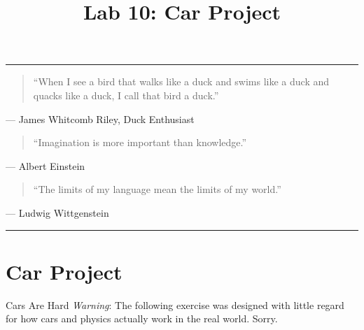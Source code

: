 \documentclass[11pt]{cselabheader}
\title{Lab 10: Car Project}
\begin{document}
\maketitle

\hrule

\begin{quotation}
  ``When I see a bird that walks like a duck and swims like a duck and quacks like
  a duck, I call that bird a duck.''
\end{quotation}
\begin{flushright}
  --- James Whitcomb Riley, Duck Enthusiast
\end{flushright}



\begin{quotation}
``Imagination is more important than knowledge.''
\end{quotation}
\begin{flushright}
  --- Albert Einstein
\end{flushright}

\begin{quotation}
``The limits of my language mean the limits of my world.''
\end{quotation}
\begin{flushright}
  --- Ludwig Wittgenstein
\end{flushright}

\hrule


\section{Car Project}

\begin{warningbox}{Cars Are Hard}
  \emph{Warning}: The following exercise was designed with little regard for
  how cars and physics actually work in the real world. Sorry.
\end{warningbox}
\end{document}
